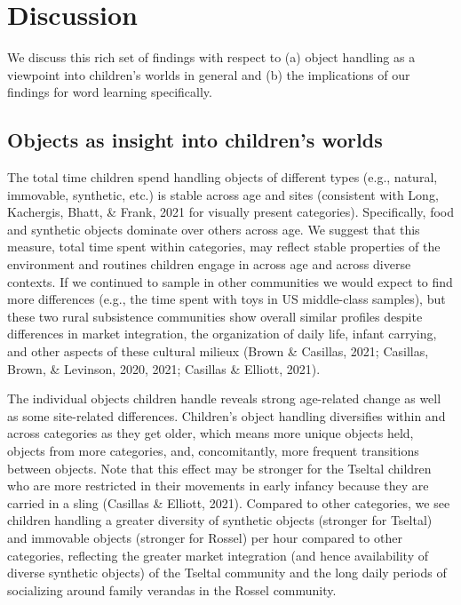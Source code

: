 \documentclass[10pt, letterpaper]{article}
\begin{document}
\hypertarget{discussion}{%
\section{Discussion}\label{discussion}}

We discuss this rich set of findings with respect to (a) object handling
as a viewpoint into children's worlds in general and (b) the
implications of our findings for word learning specifically.

\hypertarget{objects-as-insight-into-childrens-worlds}{%
\subsection{Objects as insight into children's
worlds}\label{objects-as-insight-into-childrens-worlds}}

The total time children spend handling objects of different types (e.g.,
natural, immovable, synthetic, etc.) is stable across age and sites
(consistent with Long, Kachergis, Bhatt, \& Frank, 2021 for visually
present categories). Specifically, food and synthetic objects dominate
over others across age. We suggest that this measure, total time spent
within categories, may reflect stable properties of the environment and
routines children engage in across age and across diverse contexts. If
we continued to sample in other communities we would expect to find more
differences (e.g., the time spent with toys in US middle-class samples),
but these two rural subsistence communities show overall similar
profiles despite differences in market integration, the organization of
daily life, infant carrying, and other aspects of these cultural milieux
(Brown \& Casillas, 2021; Casillas, Brown, \& Levinson, 2020, 2021;
Casillas \& Elliott, 2021).

The individual objects children handle reveals strong age-related change
as well as some site-related differences. Children's object handling
diversifies within and across categories as they get older, which means
more unique objects held, objects from more categories, and,
concomitantly, more frequent transitions between objects. Note that this
effect may be stronger for the Tseltal children who are more restricted
in their movements in early infancy because they are carried in a sling
(Casillas \& Elliott, 2021). Compared to other categories, we see
children handling a greater diversity of synthetic objects (stronger for
Tseltal) and immovable objects (stronger for Rossel) per hour compared
to other categories, reflecting the greater market integration (and
hence availability of diverse synthetic objects) of the Tseltal
community and the long daily periods of socializing around family
verandas in the Rossel community.
\end{document}
